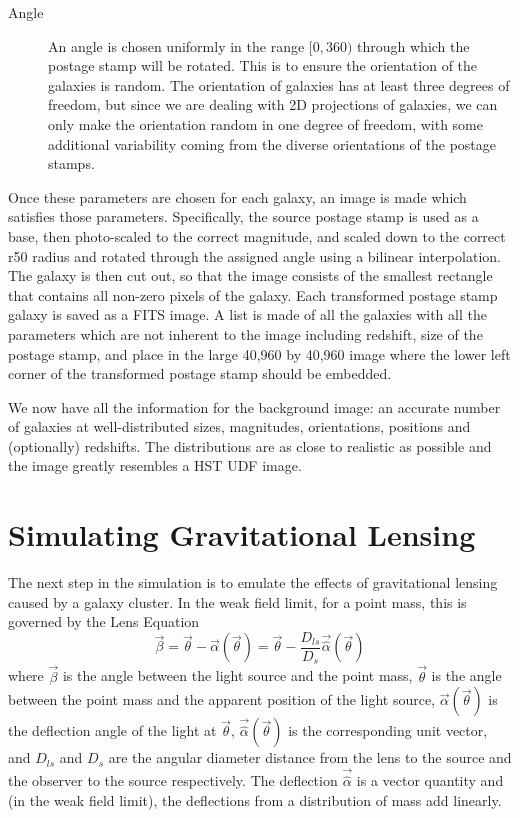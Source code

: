 \documentclass[10pt,twoside]{article}
\theoremstyle{definition}
\theoremstyle{exercise}
\begin{document}
\begin{description}
  \item[Angle] An angle is chosen uniformly in the range $[0,360)$ through which the postage stamp will be rotated. This is to ensure the orientation of the galaxies is random. The orientation of galaxies has at least three degrees of freedom, but since we are dealing with 2D projections of galaxies, we can only make the orientation random in one degree of freedom, with some additional variability coming from the diverse orientations of the postage stamps. 
\end{description}

Once these parameters are chosen for each galaxy, an image is made which satisfies those parameters. Specifically, the source postage stamp is used as a base, then photo-scaled to the correct magnitude, and scaled down to the correct r50 radius and rotated through the assigned angle using a bilinear interpolation. The galaxy is then cut out, so that the image consists of the smallest rectangle that contains all non-zero pixels of the galaxy. Each transformed postage stamp galaxy is saved as a FITS image. A list is made of all the galaxies with all the parameters which are not inherent to the image including redshift, size of the postage stamp, and place in the large 40,960 by 40,960 image where the lower left corner of the transformed postage stamp should be embedded.

We now have all the information for the background image: an accurate number of galaxies at well-distributed sizes, magnitudes, orientations, positions and (optionally) redshifts. The distributions are as close to realistic as possible and the image greatly resembles a HST UDF image.

\section{Simulating Gravitational Lensing}
The next step in the simulation is to emulate the effects of gravitational lensing caused by a galaxy cluster. In the weak field limit, for a point mass, this is governed by the Lens Equation
\begin{equation}
  \vec{\beta} = \vec{\theta} - \vec{\alpha}(\vec{\theta}) = \vec{\theta} - \frac{D_{ls}}{D_s}\vec{\hat{\alpha}}(\vec{\theta})
  \label{eq:lensing}
\end{equation}
where $\vec{\beta}$ is the angle between the light source and the point mass, $\vec{\theta}$ is the angle between the point mass and the apparent position of the light source, $\vec{\alpha}(\vec{\theta})$ is the deflection angle of the light at $\vec{\theta}$, $\vec{\hat{\alpha}}(\vec{\theta})$ is the corresponding unit vector, and $D_{ls}$ and $D_s$ are the angular diameter distance from the lens to the source and the observer to the source respectively. The deflection $\vec{\hat{\alpha}}$ is a vector quantity and (in the weak field limit), the deflections from a distribution of mass add linearly.
\end{document}
